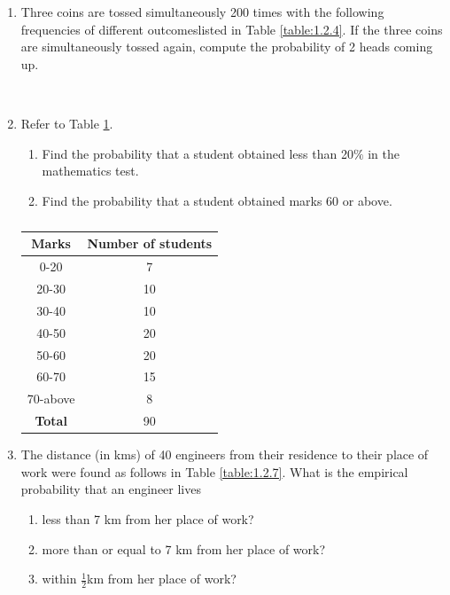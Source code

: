 \begin{enumerate}[label=\thesection.\arabic*.,ref=\thesection.\theenumi]
\item Three coins are tossed simultaneously 200 times with the following frequencies of different outcomeslisted in Table \ref{table:1.2.4}.
If the three coins are simultaneously tossed again, compute the probability of 2 heads coming up.
%
\begin{table}[!ht]
\caption{}
\label{table:1.2.4}
\end{table}
\\
\solution

\item Refer to Table \ref{table:1.2.5}.
\begin{enumerate}
\item  Find the probability that a student obtained less than 20$\%$ in the mathematics test.
\item  Find the probability that a student obtained marks 60 or above.
\end{enumerate}
\begin{table}[!ht]
\centering
\begin{tabular}{ |c|c| } 
 \hline
 \textbf{Marks} &\textbf{Number of students}\\
 \hline
  0-20 &7\\ 
  20-30 &10\\ 
  30-40 &10\\ 
  40-50 &20\\ 
  50-60 &20\\ 
  60-70 &15\\ 
  70-above &8\\ 
  \hline
 \textbf{Total}  &90\\ 
 \hline
\end{tabular}
\caption{}
\label{table:1.2.5}
\end{table}
\solution

\item The distance (in kms) of 40 engineers from their residence to their place of work were found as follows in Table \ref{table:1.2.7}.
What is the empirical probability that an engineer lives
\begin{enumerate}
\item less than 7 km from her place of work?
\item more than or equal to 7 km from her place of work? 
\item within $\frac{1}{2}$km from her place of work?
\end{enumerate}


\end{enumerate}
